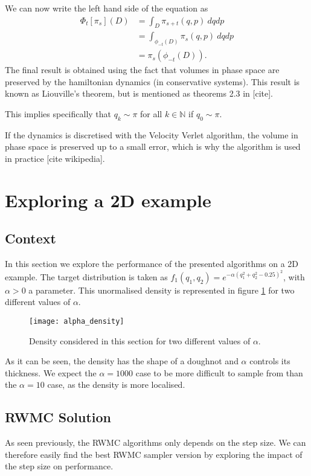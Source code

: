 \documentclass[a4paper, 12pt,oneside]{article}
\begin{document}
			We can now write the left hand side of the equation as
			\begin{align}
				\Phi_t[\pi_s](D)&=\int_D \pi_{s+t}(q,p)\ dqdp \\
					&=\int_{\phi_{-t}(D)}\pi_{s}(q,p)\ dqdp \\
					&=\pi_s(\phi_{-t}(D)).
			\end{align}
			The final result is obtained using the fact that volumes in phase space are preserved by the hamiltonian dynamics (in conservative systems). This result is known as Liouville's theorem, but is mentioned as theorems 2.3 in [cite].
	
			This implies specifically that $q_k\sim\pi$ for all $k\in\mathbb{N}$ if $q_0\sim \pi$. 
	
			If the dynamics is discretised with the Velocity Verlet algorithm, the volume in phase space is preserved up to a small error, which is why the algorithm is used in practice [cite wikipedia].
	\section{Exploring a 2D example}
		\subsection{Context}
		In this section we explore the performance of the presented algorithms on a 2D example. The target distribution is taken as $f_1(q_1,q_2)=e^{-\alpha(q_1^2+q_2^2-0.25)^2}$, with $\alpha>0$ a parameter. This unormalised density is represented in figure \ref{fig:alpha-density} for two different values of $\alpha$.
        \begin{figure}[htb]
            \centering
                \vspace{0em}
                \texttt{[image: alpha\_density]}
                \caption{Density considered in this section for two different values of $\alpha$.}
                \label{fig:alpha-density}
        \end{figure}
		As it can be seen, the density has the shape of a doughnot and $\alpha$ controls its thickness. We expect the $\alpha=1000$ case to be more difficult to sample from than the $\alpha=10$ case, as the density is more localised.
		\subsection{RWMC Solution}
			As seen previously, the RWMC algorithms only depends on the step size. We can therefore easily find the best RWMC sampler version by exploring the impact of the step size on performance. 
			
\end{document}
